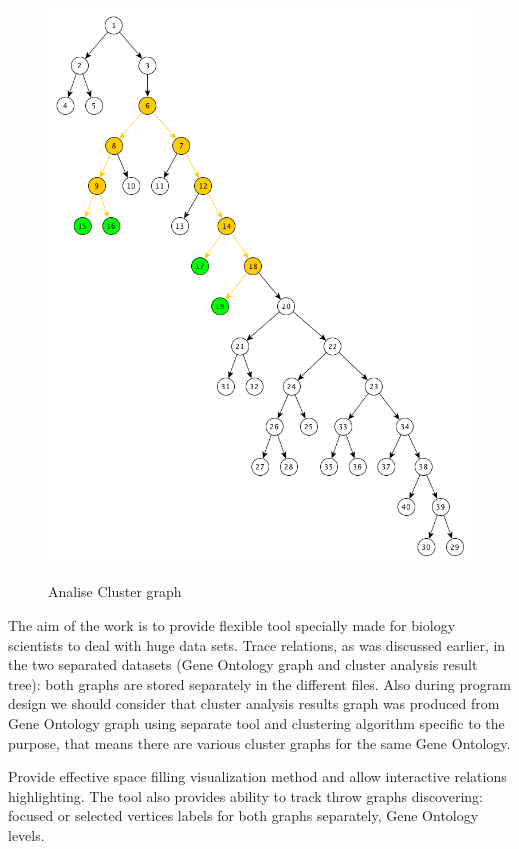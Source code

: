 \begin{figure}[h!]
{    \includegraphics[scale=0.23]{pictures/subgraph_extraction_algorithm_step_5.png}
}
\caption{Analise Cluster graph}
\end{figure}


The aim of the work is to provide flexible tool specially made for biology scientists to deal with huge data sets. Trace relations, as was discussed earlier, in the two separated datasets (Gene Ontology graph and cluster analysis result tree): both graphs are stored separately in the different files. Also during program design we should consider that cluster analysis results graph was produced from Gene Ontology graph using separate tool and clustering algorithm specific to the purpose, that means there are various cluster graphs for the same Gene Ontology.

Provide effective space filling visualization method and allow interactive relations highlighting. The tool also provides ability to track throw graphs discovering: focused or selected vertices labels for both graphs separately, Gene Ontology levels. 

